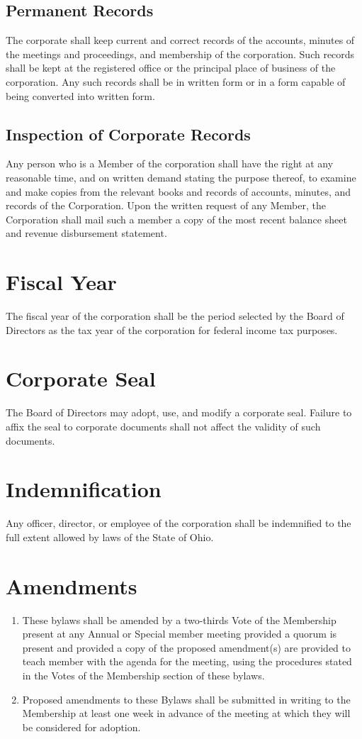 \documentclass{article}
\begin{document}
\subsection{Permanent Records}
The corporate shall keep current and correct records of the accounts, minutes of the 
meetings and proceedings, and membership of the corporation.  Such records shall be kept 
at the registered office or the principal place of business of the corporation.  Any such 
records shall be in written form or in a form capable of being converted into written form.

\subsection{Inspection of Corporate Records}
Any person who is a Member of the corporation shall have the right at any reasonable time, 
and on written demand stating the purpose thereof, to examine and make copies from the 
relevant books and records of accounts, minutes, and records of the Corporation.  Upon 
the written request of any Member, the Corporation shall mail such a member a copy of the 
most recent balance sheet and revenue disbursement statement.
\section{Fiscal Year}
The fiscal year of the corporation shall be the period selected by the Board of Directors as 
the tax year of the corporation for federal income tax purposes.
\section{Corporate Seal}
The Board of Directors may adopt, use, and modify a corporate seal.  Failure to affix the 
seal to corporate documents shall not affect the validity of such documents.
\section{Indemnification}
Any officer, director, or employee of the corporation shall be indemnified to the full extent 
allowed by laws of the State of Ohio.
\section{Amendments}
\begin{enumerate}
\item These bylaws shall be amended by a two-thirds Vote of the Membership present at 
any Annual or Special member meeting provided a quorum is present and provided a copy 
of the proposed amendment(s) are provided to teach member with the agenda for the 
meeting, using the procedures stated in the Votes of the Membership section of these 
bylaws.
\item Proposed amendments to these Bylaws shall be submitted in writing to the 
Membership at least one week in advance of the meeting at which they will be considered 
for adoption.
\end{enumerate}
\end{document}
